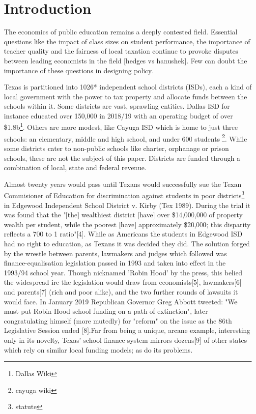 \documentclass[11pt]{article}
\begin{document}
\setlength{\baselineskip}{0.3in} 

\tableofcontents
\clearpage

\section{Introduction}
\label{s:intro}

The economics of public education remains a deeply contested field. Essential questions like the impact of class sizes on student performance, the importance of teacher quality and the fairness of local taxation continue to provoke disputes between leading economists in the field [hedges vs hanushek]. Few can doubt the importance of these questions in designing policy. 

Texas is partitioned into 1026* independent school districts (ISDs), each a kind of local government with the power to tax property and allocate funds between the schools within it. Some districts are vast, sprawling entities. Dallas ISD for instance educated over 150,000 in 2018/19 with an operating budget of over \$1.8b\footnote{Dallas Wiki}. Others are more modest, like Cayuga ISD which is home to just three schools: an elementary, middle and high school, and under 600 students \footnote{cayuga wiki}. While some districts cater to non-public schools like charter, orphanage or prison schools, these are not the subject of this paper. Districts are funded through a combination of local, state and federal revenue. 

Almost twenty years would pass until Texans would successfully sue the Texan Commisioner of Education for discrimination against students in poor districts\footnote{statute} in Edgewood Independent School District v. Kirby (Tex 1989). During the trial it was found that the "[the] wealthiest district [have] over \$14,000,000 of property wealth per student, while the poorest [have] approximately \$20,000; this disparity reflects a 700 to 1 ratio"[4]. While as Americans the students in Edgewood ISD had no right to education, as Texans it was decided they did. The solution forged by the wrestle between parents, lawmakers and judges which followed was finance-equalisation legislation passed in 1993 and taken into effect in the 1993/94 school year. Though nicknamed 'Robin Hood' by the press, this belied the widespread ire the legislation would draw from economists[5], lawmakers[6] and parents[7] (rich and poor alike), and the two further rounds of lawsuits it would face. In January 2019 Republican Governor Greg Abbott tweeted: "We must put Robin Hood school funding on a path of extinction", later congratulating himself (more mutedly) for "reform" on the issue as the 86th Legislative Session ended [8].Far from being a unique, arcane example, interesting only in its novelty, Texas' school finance system mirrors dozens[9] of other states which rely on similar local funding models; as do its problems. 
\end{document}
